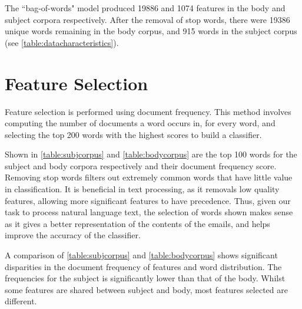 \documentclass[10pt, a4paper]{article}
\begin{document}
The ``bag-of-words" model produced 19886 and 1074 features in the body and subject corpora respectively. After the removal of stop words, there were 19386 unique words remaining in the body corpus, and 915 words in the subject corpus (see \autoref{table:datacharacteristics}).

\section{Feature Selection}

Feature selection is performed using document frequency. This method involves computing the number of documents a word occurs in, for every word, and selecting the top 200 words with the highest scores to build a classifier.

Shown in \autoref{table:subjcorpus} and \autoref{table:bodycorpus} are the top 100 words for the subject and body corpora respectively and their document frequency score. Removing stop words filters out extremely common words that have little value in classification. It is beneficial in text processing, as it removals low quality features, allowing more significant features to have precedence. Thus, given our task to process natural language text, the selection of words shown makes sense as it gives a better representation of the contents of the emails, and helps improve the accuracy of the classifier. %

A comparison of \autoref{table:subjcorpus} and \autoref{table:bodycorpus} shows significant disparities in the document frequency of features and word distribution. The frequencies for the subject is significantly lower than that of the body. Whilst some features are shared between subject and body, most features selected are different.
\end{document}

